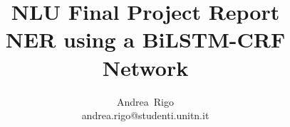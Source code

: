 \documentclass[journal]{IEEEtran}
\begin{document}
%
\title{NLU Final Project Report\\NER using a BiLSTM-CRF Network}
%
%
%

\author{Andrea~Rigo\\andrea.rigo@studenti.unitn.it}%


% 
%



%
{}
% 
\end{document}
